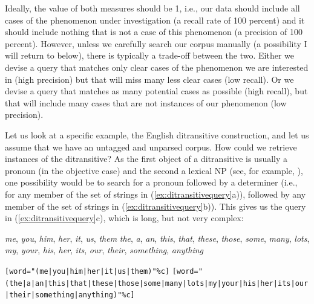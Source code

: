 Ideally, the value of both measures should be 1, i.e., our data should include all cases of the phenomenon under investigation (a recall  rate of 100 percent) and it should include nothing that is not a case of this phenomenon (a precision  of 100 percent). However, unless we carefully search our corpus manually  (a possibility I will return to below), there is typically a trade\hyp{}off between the two. Either we devise a query  that matches only clear cases of the phenomenon we are interested in (high precision) but that will miss many less clear cases (low recall).  Or we devise a query that matches as many potential cases as possible (high recall), but that will include many cases that are not instances of our phenomenon (low  precision).

Let us look at a specific example, the English ditransitive  construction, and let us assume that we have an untagged  and unparsed corpus. How could we retrieve  instances of the ditransitive? As the first object of a ditransitive is usually a pronoun  (in the objective case) and the second a lexical NP (see, for example, \citealt{thompson_iconicity_1987}), one possibility would be to search for a pronoun  followed by a determiner  (i.e., for any member of the set of strings in (\ref{ex:ditransitivequery}a)), followed by any member of the set of strings in (\ref{ex:ditransitivequery}b)).  This gives us the query  in (\ref{ex:ditransitivequery}c), which is long, but not very complex:

\begin{exe}
\ex
\begin{xlist}
\label{ex:ditransitivequery}
\ex \textit{me}, \textit{you}, \textit{him}, \textit{her}, \textit{it}, \textit{us}, \textit{them}
\ex \textit{the}, \textit{a}, \textit{an}, \textit{this}, \textit{that}, \textit{these}, \textit{those}, \textit{some}, \textit{many}, \textit{lots}, \textit{my}, \textit{your}, \textit{his}, \textit{her}, \textit{its}, \textit{our}, \textit{their}, \textit{something}, \textit{anything}
\ex \begin{minipage}[t]{0.85\textwidth} \raggedright \texttt{[word="(me|\allowbreak you|\allowbreak him|\allowbreak her|\allowbreak it|\allowbreak us|\allowbreak them)"\%c]} \texttt{[word="(the|\allowbreak a|\allowbreak an|\allowbreak this|\allowbreak that|\allowbreak these|\allowbreak those|\allowbreak some|\allowbreak many|\allowbreak lots|\allowbreak my|\allowbreak your|\allowbreak his|\allowbreak her|\allowbreak its|\allowbreak our|\allowbreak their|\allowbreak something|\allowbreak anything)"\%c]} \end{minipage}
\end{xlist}
\end{exe}


